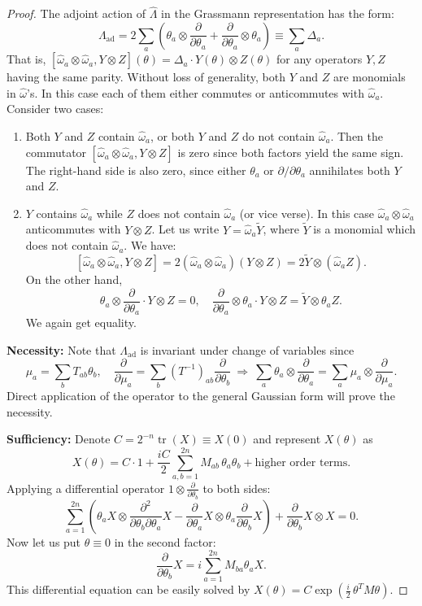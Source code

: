 \documentclass[aps,prx,superscriptaddress,nofootinbib]{revtex4}
\def \tr{\operatorname{tr}}
\begin{document}
\begin{proof}
The adjoint action of $\hat \Lambda$ in the Grassmann representation has the form:
\begin{equation}
	\Lambda_\text{ad} = 2\sum_a\left(\theta_a\otimes \frac{\partial}{\partial\theta_a}+\frac{\partial}{\partial\theta_a}\otimes \theta_a\right) \equiv \sum_a \Delta_a.
\end{equation}
That is, $[\hat\omega_a\otimes \hat \omega_a, Y \otimes Z](\theta)= \Delta_a \cdot Y(\theta)\otimes Z(\theta)$ for any operators $Y,Z$ having the same parity. Without loss of generality, both $Y$ and $Z$ are monomials in $\hat\omega$'s. In this case each of them either commutes or anticommutes with $\hat{\omega}_a$. Consider two cases:
\begin{enumerate}
	\item Both $Y$ and $Z$ contain $\hat{\omega}_a$, or both $Y$ and $Z$ do not contain $\hat{\omega}_a$. Then the commutator $[\hat{\omega}_a\otimes \hat{\omega}_a,Y\otimes Z]$ is zero since both factors yield the same sign. The right-hand side is also zero, since either $\theta_a$ or $\partial/\partial{\theta_a}$ annihilates both $Y$ and $Z$.
	\item $Y$ contains $\hat{\omega}_a$ while $Z$ does not contain $\hat{\omega}_a$ (or vice verse). In this case $\hat{\omega}_a\otimes\hat{\omega}_a$ anticommutes with $Y\otimes Z$. Let us write $Y=\hat{\omega}_a \tilde{Y}$, where $\tilde{Y}$ is a monomial which does not contain $\hat{\omega}_a$. We have: $$[\hat{\omega}_a\otimes \hat{\omega}_a,Y\otimes Z]=2(\hat{\omega}_a\otimes \hat{\omega}_a)(Y\otimes Z) = 2\tilde{Y}\otimes
(\hat{\omega}_a Z).$$
On the other hand,
$$\theta_a\otimes \frac{\partial}{\partial\theta_a} \cdot Y \otimes Z =0,\quad\frac{\partial}{\partial\theta_a}\otimes \theta_a \cdot Y\otimes Z = \tilde{Y}\otimes \theta_a Z.$$
We again get equality.
\end{enumerate}

\noindent\textbf{Necessity:}
Note that $\Lambda_\text{ad}$ is invariant under change of variables since
$$
\mu_a = \sum_b T_{ab}\theta_b,\quad \frac{\partial}{\partial\mu_a} = \sum_b(T^{-1})_{ab}\frac{\partial}{\partial\theta_b} \ \Longrightarrow\ \sum_a \theta_a\otimes\frac{\partial}{\partial\theta_a} = \sum_a \mu_a\otimes\frac{\partial}{\partial\mu_a}.
$$
Direct application of the operator to the general Gaussian form will prove the necessity.

\noindent\textbf{Sufficiency:} Denote $C=2^{-n}\tr{(X)}\equiv X(0)$ and represent $X(\theta)$ as
$$X(\theta)= C\cdot 1 + \frac{iC}2\sum_{a,b=1}^{2n} M_{ab}\,\theta_a \theta_b + \mbox{higher order terms}.$$
Applying a differential operator $1\otimes \frac{\partial}{\partial\theta_b}$ to both sides:
$$
\sum_{a=1}^{2n} \left(\theta_a X \otimes \frac{\partial^2}{\partial \theta_b \partial \theta_a} X - \frac{\partial}{\partial\theta_a} X \otimes \theta_a\frac{\partial}{\partial\theta_b} X \right) + \frac{\partial}{\partial\theta_b} X \otimes X = 0.
$$
Now let us put $\theta\equiv 0$ in the second factor:
$$
\frac{\partial}{\partial\theta_b} X = i\sum_{a=1}^{2n} M_{ba} \theta_a X.
$$
This differential equation can be easily solved by $X(\theta)=C \exp{\left( \frac{i}2\, \theta^T M \theta \right)}$. 


\end{proof}
\end{document}
